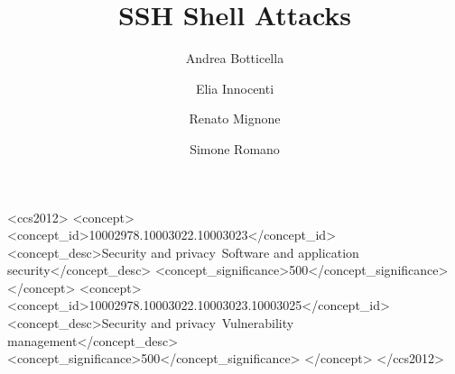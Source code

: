 \documentclass[acmlarge]{template/column-format-template/acmart}
\begin{document}
\title{SSH Shell Attacks}


\author{Andrea Botticella}

\author{Elia Innocenti}
\authornotemark[1]

\author{Renato Mignone}
\authornotemark[1]

\author{Simone Romano}
\authornotemark[1]

\renewcommand{\shortauthors}{Botticella, Innocenti, Mignone, and Romano}

\begin{CCSXML}
<ccs2012>
   <concept>
       <concept_id>10002978.10003022.10003023</concept_id>
       <concept_desc>Security and privacy~Software and application security</concept_desc>
       <concept_significance>500</concept_significance>
       </concept>
   <concept>
       <concept_id>10002978.10003022.10003023.10003025</concept_id>
       <concept_desc>Security and privacy~Vulnerability management</concept_desc>
       <concept_significance>500</concept_significance>
       </concept>
</ccs2012>
\end{CCSXML}





\maketitle

\end{document}
